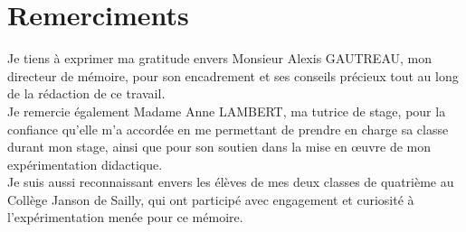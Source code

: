 \section*{Remerciments}


Je tiens à exprimer ma gratitude envers Monsieur Alexis GAUTREAU,
mon directeur de mémoire,
pour son encadrement et ses conseils précieux tout au long de la rédaction de ce travail.\\

Je remercie également Madame Anne LAMBERT,
ma tutrice de stage,
pour la confiance qu'elle m'a accordée en me permettant de prendre en charge sa classe durant mon stage,
ainsi que pour son soutien dans la mise en œuvre de mon expérimentation didactique.\\

Je suis aussi reconnaissant envers les élèves de mes deux classes de quatrième au Collège Janson de Sailly,
qui ont participé avec engagement et curiosité à l'expérimentation menée pour ce mémoire.